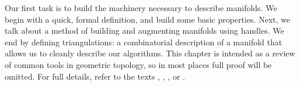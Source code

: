 Our first task is to build the machinery necessary to describe manifolds.
We begin with a quick, formal definition, and build some basic properties.
Next, we talk about a method of building and augmenting manifolds using handles.
We end by defining triangulations: a combinatorial description of a manifold that allows us to cleanly describe our algorithms.
This chapter is intended as a review of common tools in geometric topology, so in most places full proof will be omitted.
For full details, refer to the texts \cite{GompStip}, \cite{Hirsch67}, \cite{Kosi93}, or \cite{Lee00}.